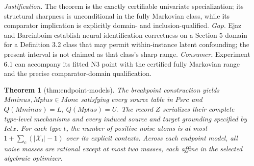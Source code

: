 \documentclass{article}
\newtheorem{theorem}{Theorem}
\begin{document}
\par\smallskip\noindent \textit{Justification.} The theorem is the exactly certifiable univariate specialization; its structural sharpness is unconditional in the fully Markovian class, while its comparator implication is explicitly domain- and inclusion-qualified. \textit{Gap.} Ejaz and Bareinboim establish neural identification correctness on a Section 5 domain for a Definition 3.2 class that may permit within-instance latent confounding; the present interval is not claimed as that class's sharp range. \textit{Consumer.} Experiment 6.1 can accompany its fitted N3 point with the certified fully Markovian range and the precise comparator-domain qualification.

\begin{theorem}[thm:endpoint-models]\label{thm:endpoint-models}
The breakpoint construction yields \(Mminus,Mplus\in Mone\) satisfying every source table in \(Psrc\) and \(Q(Mminus)=L\), \(Q(Mplus)=U\). The record \(Z\) serializes their complete type-level mechanisms and every induced source and target grounding specified by \(Ictx\). For each type \(t\), the number of positive noise atoms is at most \(1+\sum_c(|\mathcal X_t|-1)\) over its explicit contexts. Across each endpoint model, all noise masses are rational except at most two masses, each affine in the selected algebraic optimizer.
\end{theorem}
\end{document}
